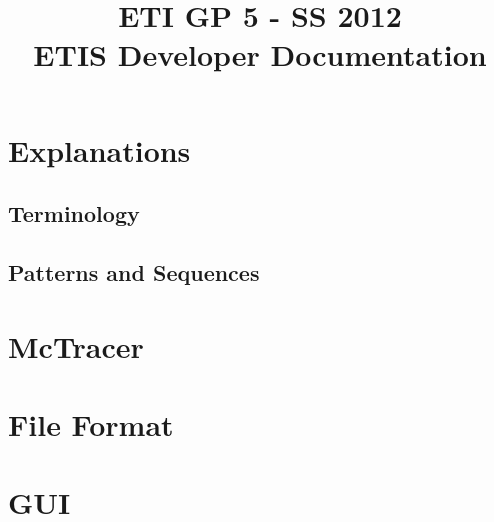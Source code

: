 \documentclass{scrartcl}
\title{ETI GP 5 - SS 2012\\ETIS Developer Documentation}
\begin{document}
\maketitle
\tableofcontents
\newpage

\section{Explanations}
	\subsection{Terminology} 
	\subsection{Patterns and Sequences} 
\newpage
\section{McTracer} 
\newpage
\section{File Format} 
\newpage
\section{GUI} 
\end{document}
